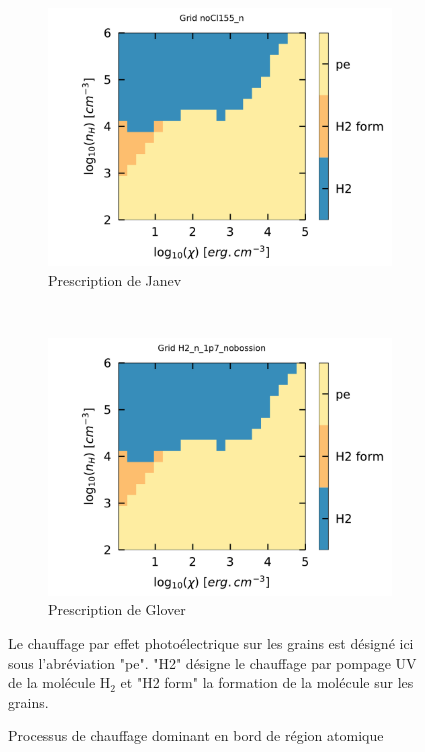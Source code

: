 \begin{appendices}
\begin{figure}[!p]
    \centering
    \begin{subfigure}[t]{0.49\textwidth} %
        \centering \includegraphics[trim = {0 0 0 1cm },clip,width=1\textwidth]{figure/H2/grid_janev/mapGmax.pdf}
        \caption{Prescription de Janev}
    \end{subfigure}
    ~ 
    \begin{subfigure}[t]{0.49\textwidth}
        \centering \includegraphics[trim = {0 0 0 1cm },clip,width=1\textwidth]{figure/H2/grid_glover/mapGmax.pdf}
        \caption{Prescription de Glover}
    \end{subfigure}
    \caption{Processus de chauffage dominant en bord de région atomique}
    \begin{minipage}{\textwidth}
    Le chauffage par effet photoélectrique sur les grains est désigné ici sous l'abréviation "pe". "H2" désigne le chauffage par pompage UV de la molécule $\mathrm{H}_2$ et "H2 form" la formation de la molécule sur les grains.
    \end{minipage}
    \label{fig:H2:JanevGlover:Gmax}
    \hspace{1em}
    

\end{figure}
\end{appendices}
